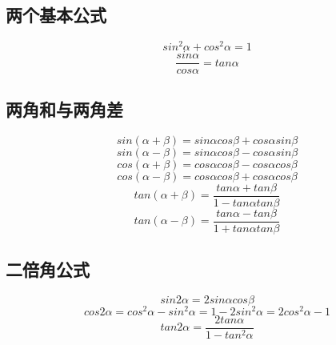 
\begin{issues}
\issueDraft
\end{issues}

\subsection{两个基本公式}
\begin{equation}
sin^2\alpha + cos^2\alpha = 1
\end{equation}
\begin{equation}
\frac{sin\alpha}{cos\alpha} = tan\alpha
\end{equation}

\subsection{两角和与两角差}
\begin{equation}
sin(\alpha + \beta) = sin\alpha cos\beta + cos\alpha sin\beta
\end{equation}
\begin{equation}
sin(\alpha - \beta) = sin\alpha cos\beta - cos\alpha sin\beta
\end{equation}
\begin{equation}
cos(\alpha + \beta) = cos\alpha cos\beta - cos\alpha cos\beta
\end{equation}
\begin{equation}
cos(\alpha - \beta) = cos\alpha cos\beta + cos\alpha cos\beta
\end{equation}
\begin{equation}
tan(\alpha + \beta) = \frac{tan\alpha+tan\beta}{1-tan\alpha tan\beta}
\end{equation}
\begin{equation}
tan(\alpha - \beta) = \frac{tan\alpha - tan\beta}{1+tan\alpha tan\beta}
\end{equation}

\subsection{二倍角公式}
\begin{equation}
sin2\alpha = 2sin\alpha cos\beta
\end{equation}
\begin{equation}
cos2\alpha = cos^2\alpha - sin^2\alpha = 1 - 2sin^2\alpha = 2cos^2\alpha -1
\end{equation}
\begin{equation}
tan2\alpha = \frac{2tan\alpha}{1-tan^2\alpha}
\end{equation}

